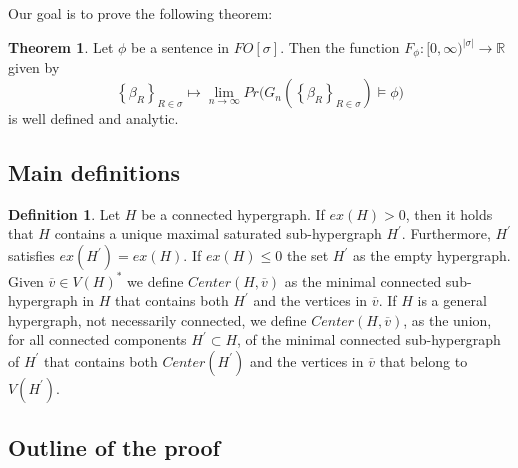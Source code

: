 \documentclass[12pt,notitlepage,a4paper]{article}
\theoremstyle{definition}
\newtheorem{theorem}{Theorem}[section]
\newtheorem{definition}{Definition}[section]
\newcommand{\R}{\mathbb{R}}
\newcommand{\Ln}{\lim\limits_{n\to \infty}}
\newcommand{\InR}[1]{\left\{ #1_R \right\}_{R\in \sigma}}
\begin{document}
Our goal is to prove the following theorem:


\begin{theorem} \label{thm:main}
	Let $\phi$ be a sentence in $FO[\sigma]$. Then
	the function
	$F_\phi: [0,\infty)^{|\sigma|}
	\rightarrow \R$ given by 
	\[
	\InR{\beta} \mapsto \Ln Pr\big( G_n\left(
	\InR{\beta}\right) \models \phi\big)
	\]
	is well defined and analytic. 
\end{theorem}

\subsection{Main definitions}

\begin{definition}
Let $H$ be a connected hypergraph. If $ex(H)>0$, then it holds that
$H$ contains a unique maximal saturated sub-hypergraph $H^\prime$. 
Furthermore, $H^\prime$ satisfies $ex(H^\prime)=ex(H)$. If $ex(H)\leq 0$ the
set $H^\prime$ as the empty hypergraph. Given
$\overline{v}\in V(H)^*$ we define $Center(H,\overline{v})$ as the 
minimal connected sub-hypergraph in $H$ that contains both $H^\prime$
and the vertices in $\overline{v}$. 
If $H$ is a general hypergraph, not necessarily connected, 
we define $Center(H,\overline{v})$,
as the union, for all connected components $H^\prime \subset H$,
of the minimal connected sub-hypergraph of $H^\prime$ that
contains both $Center(H^\prime)$
and the vertices in $\overline{v}$
that belong to $V(H^\prime)$.
\end{definition}




\subsection{Outline of the proof}
\end{document}

